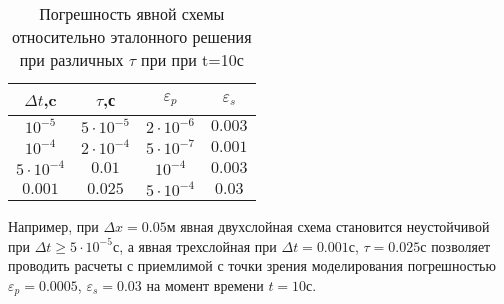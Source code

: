 \begin{table}[H]
\caption{Погрешность явной схемы относительно эталонного решения при различных $\tau$ при при t=10с}
\label{tabular:results}
\begin{center}
\begin{tabular}{|c|c|c|c|}
\hline
$\Delta t$,c & $\tau$,с & $\varepsilon_p$ & $\varepsilon_s$  \\
\hline
$ 10^{-5}$ & $5 \cdot 10^{-5}$ & $ 2 \cdot 10^{-6}$ & $ 0.003 $ \\
\hline
$ 10^{-4}$ & $2 \cdot 10^{-4}$ & $ 5 \cdot 10^{-7}$ & $ 0.001 $ \\
\hline
$5 \cdot 10^{-4}$ & $0.01$ & $ 10^{-4}$ & $ 0.003 $ \\
\hline
$0.001$ & $0.025$ & $ 5 \cdot 10^{-4}$ & $ 0.03 $ \\
\hline
\end{tabular}
\end{center}
\end{table}

Например, при $\Delta x=0.05$м явная двухслойная схема становится неустойчивой при $\Delta t \ge 5 \cdot 10^{-5}$с, а явная
трехслойная при $\Delta t=0.001$с, $\tau=0.025$с позволяет проводить расчеты с приемлимой с точки зрения моделирования
погрешностью $\varepsilon_p=0.0005$, $\varepsilon_s=0.03$ на момент времени $t=10$с.